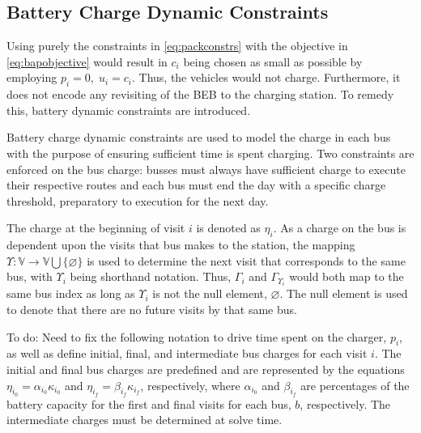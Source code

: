 \documentclass[letterpaper, 10pt, conference]{IEEEtran}
\newcommand{\TODO}[1]{{\color{green} To do: #1}}                                %
\begin{document}
\subsection{Battery Charge Dynamic Constraints}
\label{sec:batt_dynamics}
Using purely the constraints in \eqref{eq:packconstrs} with the objective in \eqref{eq:bapobjective} would result in
$c_i$ being chosen as small as possible by employing $p_i = 0,\; u_i = c_i$. Thus, the vehicles would not charge.
Furthermore, it does not encode any revisiting of the BEB to the charging station. To remedy this, battery dynamic
constraints are introduced.

Battery charge dynamic constraints are used to model the charge in each bus with the purpose of ensuring sufficient time is spent charging. Two constraints are enforced on the bus charge: busses must always have sufficient charge to execute their respective routes and each bus must end the day with a specific charge threshold, preparatory to execution for the next day.

The charge at the beginning of visit $i$ is denoted as $\eta_i$. As a charge on the bus is dependent upon the visits that bus makes to the station, the mapping $\Upsilon: \mathbb{V} \rightarrow \mathbb{V} \bigcup \{\varnothing\}$ is used to determine the next visit that corresponds to the same bus, with $\Upsilon_i$ being shorthand notation. Thus, $\Gamma_i$ and $\Gamma_{\Upsilon_i}$ would both map to the same bus index as long as $\Upsilon_i$ is not the null element, $\varnothing$. The null element is used to denote that there are no future visits by that same bus.

\TODO{Need to fix the following notation}
to drive time spent on the charger, $p_i$, as well as define initial, final,
and intermediate bus charges for each visit $i$. The initial and final bus charges are predefined and are represented by
the equations $\eta_{i_0} = \alpha_{i_0} \kappa_{i_0}$ and $\eta_{i_f} = \beta_{i_f} \kappa_{i_f}$, respectively, where $\alpha_{i_0}$ and $\beta_{i_f}$
are percentages of the battery capacity for the first and final visits for each bus, $b$, respectively. The intermediate
charges must be determined at solve time.

\end{document}

